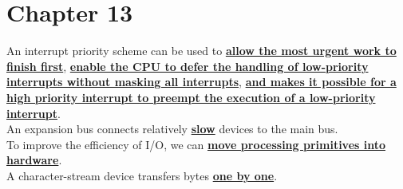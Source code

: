 \documentclass[10pt]{article}
\newcommand{\qw}[1]{\textbf{\ul{#1}}}
\begin{document}
\section*{\centering Chapter 13}
An interrupt priority scheme can be used to \qw{allow the most urgent work to finish first}, \qw{enable the CPU to defer the handling of low-priority interrupts without masking all interrupts}, \qw{and makes it possible for a high priority interrupt to preempt the execution of a low-priority interrupt}.\\[2mm]
An expansion bus connects relatively \qw{slow} devices to the main bus.\\[2mm]
To improve the efficiency of I/O, we can \qw{move processing primitives into hardware}.\\[2mm]
A character-stream device transfers bytes \qw{one by one}.\\[2mm]

\newpage
\end{document}
